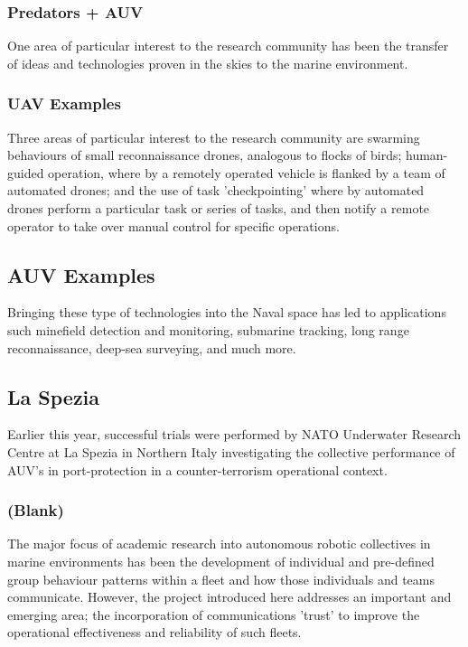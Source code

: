 \documentclass[oneside,11pt,a4paper]{Latex/Classes/PhDthesisPSnPDF}
\begin{document}
\begin{doublespace}
\subsubsection{Predators + AUV}  One area of particular interest to the research
community has been the transfer of ideas and technologies proven in the skies to
the marine environment.

\subsubsection{UAV Examples}  Three areas of particular interest to the research
community are swarming behaviours of small reconnaissance drones, analogous to
flocks of birds; human-guided operation, where by a remotely operated vehicle is 
flanked by a team of automated drones; and the use of task 'checkpointing'
where by automated drones perform a particular task or series of tasks, and 
then notify a remote operator to take over manual control for specific
operations.

\subsection{AUV Examples}  Bringing these type of technologies into the Naval
space has led to applications such minefield detection and monitoring, submarine tracking,
long range reconnaissance, deep-sea surveying, and much more. 

\subsection{La Spezia} Earlier this year,
successful trials were performed by NATO Underwater Research Centre at La Spezia
in Northern Italy investigating the collective performance of AUV's in port-protection in a
counter-terrorism operational context.

\subsubsection{(Blank)} The major focus of academic research into autonomous
robotic collectives in marine environments has been the development of
individual and pre-defined group behaviour patterns within a fleet and how
those individuals and teams communicate. However, the project introduced here
addresses an important and emerging area; the incorporation of communications
'trust' to improve the operational effectiveness and reliability of such fleets.


\end{doublespace}
\end{document}
